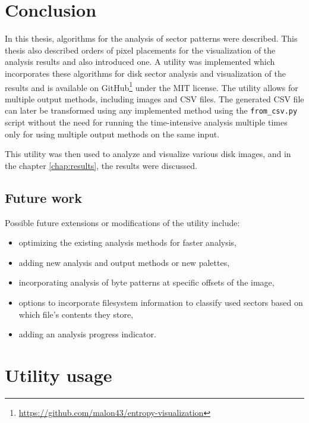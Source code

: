 \documentclass[
  digital, %
  color,   %
  oneside, %
  lof,     %
  nolot,     %
]{fithesis4}
\begin{document}
\chapter{Conclusion}
\label{chap:conclusion}

In this thesis, algorithms for the analysis of sector patterns were described.
This thesis also described orders of pixel placements for the visualization of the analysis results and also introduced one.
A utility was implemented which incorporates these algorithms for disk sector analysis and visualization of the results and is available on GitHub\footnote{\url{https://github.com/malon43/entropy-visualization}} under the MIT license.
The utility allows for multiple output methods, including images and CSV files.
The generated CSV file can later be transformed using any implemented method using the \texttt{from\_csv.py} script without the need for running the time-intensive analysis multiple times only for using multiple output methods on the same input. 

This utility was then used to analyze and visualize various disk images, and in the chapter \ref{chap:results}, the results were discussed.

\section{Future work}
\label{sec:future-work}

Possible future extensions or modifications of the utility include:
\begin{itemize}
  \item optimizing the existing analysis methods for faster analysis,
  \item adding new analysis and output methods or new palettes,
  \item incorporating analysis of byte patterns at specific offsets of the image,
  \item options to incorporate filesystem information to classify used sectors based on which file's contents they store,
  \item adding an analysis progress indicator.
\end{itemize}

\makeatletter\thesis@blocks@clear\makeatother
\sloppy
\printbibliography

\appendix %
\chapter{Utility usage}
\label{chap:utility-usage}
\end{document}
